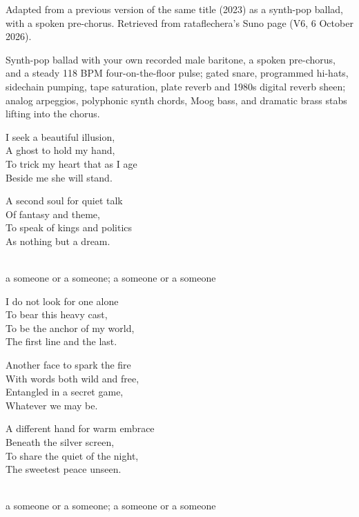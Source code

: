 
\begin{notes}
Adapted from a previous version of the same title (2023) as a synth-pop ballad, with a spoken pre-chorus. Retrieved from rataflechera's Suno page (V6, 6 October 2026).
\end{notes}
\begin{style}
Synth-pop ballad with your own recorded male baritone, a spoken pre-chorus, and a steady 118 BPM four-on-the-floor pulse; gated snare, programmed hi-hats, sidechain pumping, tape saturation, plate reverb and 1980s digital reverb sheen; analog arpeggios, polyphonic synth chords, Moog bass, and dramatic brass stabs lifting into the chorus.
\end{style}
\begin{lyrics}
I seek a beautiful illusion,\\
A ghost to hold my hand,\\
To trick my heart that as I age\\
Beside me she will stand.

A second soul for quiet talk\\
Of fantasy and theme,\\
To speak of kings and politics\\
As nothing but a dream.

\\
a someone or a someone; a someone or a someone

I do not look for one alone\\
To bear this heavy cast,\\
To be the anchor of my world,\\
The first line and the last.

Another face to spark the fire\\
With words both wild and free,\\
Entangled in a secret game,\\
Whatever we may be.

A different hand for warm embrace\\
Beneath the silver screen,\\
To share the quiet of the night,\\
The sweetest peace unseen.

\\
a someone or a someone; a someone or a someone


\end{lyrics}
